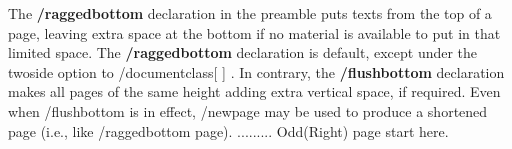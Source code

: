 \documentclass[twoside,a4paper]{article}
\begin{document}
\Huge
The {\bf /raggedbottom} declaration in the preamble puts texts from the top of a page, leaving extra space at the bottom if no material is available to put in that limited space.\newpage
The {\bf /raggedbottom} declaration is default, except under the twoside option to /documentclass[ ]{ }. \pagebreak In contrary, the {\bf /flushbottom} declaration makes all pages of the same\clearpage
height adding extra vertical space, if required. Even when /flushbottom is in effect, /newpage may be used to produce a shortened page (i.e., like /raggedbottom page).\newpage
.........\cleardoublepage
Odd(Right) page start here.
\end{document}

